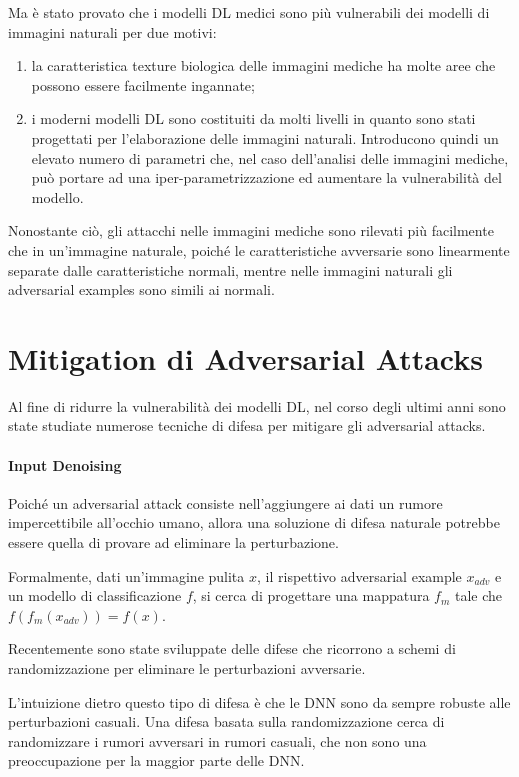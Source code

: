 Ma è stato provato %
\cite{ma2021understanding} che i modelli DL medici sono più vulnerabili dei modelli di immagini naturali per due motivi: 
    \begin{enumerate}
        \item la caratteristica texture biologica delle immagini mediche ha molte aree che possono essere facilmente ingannate;
        \item i moderni modelli DL sono costituiti da molti livelli in quanto sono stati progettati per l'elaborazione delle immagini naturali. Introducono quindi un elevato numero di parametri che, nel caso dell'analisi delle immagini mediche, può portare ad una iper-parametrizzazione ed aumentare la vulnerabilità del modello.
    \end{enumerate}

Nonostante ciò, gli attacchi nelle immagini mediche sono rilevati più facilmente che in un'immagine naturale, poiché le caratteristiche avversarie sono linearmente separate dalle caratteristiche normali, mentre nelle immagini naturali gli adversarial examples sono simili ai normali.

\newpage

\section{Mitigation di Adversarial Attacks}
Al fine di ridurre la vulnerabilità dei modelli DL, nel corso degli ultimi anni sono state studiate numerose tecniche di difesa per mitigare gli adversarial attacks.

\paragraph{Input Denoising}
Poiché un adversarial attack consiste nell'aggiungere ai dati un rumore impercettibile all'occhio umano, allora una soluzione di difesa naturale potrebbe essere quella di provare ad eliminare la perturbazione.

Formalmente, dati un'immagine pulita $x$, il rispettivo adversarial example $x_{adv}$ e un modello di classificazione $f$, si cerca di progettare una mappatura $f_m$ tale che $f(f_m(x_{adv})) = f(x)$.

Recentemente sono state sviluppate delle difese che ricorrono a schemi di randomizzazione per eliminare le perturbazioni avversarie. 

L'intuizione dietro questo tipo di difesa è che le DNN sono da sempre robuste alle perturbazioni casuali. Una difesa basata sulla randomizzazione cerca di randomizzare i rumori avversari in rumori casuali, che non sono una preoccupazione per la maggior parte delle DNN. 
\\

